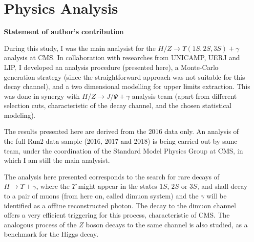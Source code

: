 \chapter{Physics Analysis}

\begin{tcolorbox}
    {\footnotesize 
    \textbf{Statement of author's contribution}

    \vspace{1em}
    During this study, I was the main analysist for the $H/Z \rightarrow \Upsilon(1S, 2S, 3S) + \gamma$ analysis at CMS. In collaboration with researches from UNICAMP, UERJ and LIP, I developed an analysis procedure (presented here), a Monte-Carlo generation strategy (since the straightforward approach was not suitable for this decay channel), and a two dimensional modelling for upper limits extraction. This was done in synergy with $H/Z \rightarrow J/\Psi + \gamma$ analysis team (apart from different selection cuts, characteristic of the decay channel, and the chosen statistical modeling). 
    
    \vspace{1em}
    The results presented here are derived from the 2016 data only. An analysis of the full Run2 data sample (2016, 2017 and 2018) is being carried out by same team, under the coordination of the Standard Model Physics Group at CMS, in which I am still the main analysist.

    \vspace{1em}
    }
\end{tcolorbox}

The analysis here presented corresponds to the search for rare decays of $H \rightarrow \Upsilon + \gamma$, where the $\Upsilon$ might appear in the states $1S$, $2S$ or $3S$, and shall decay to a pair of muons (from here on, called dimuon system) and the $\gamma$ will be identified as a offline reconstructed photon. The decay to the dimuon channel offers a very efficient triggering for this process, characteristic of CMS. The analogous process of the $Z$ boson decays to the same channel is also studied, as a benchmark for the Higgs decay.

